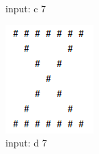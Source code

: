 \begin{figure}[H]
\begin{subfigure}{0.19\linewidth}
            \caption{input: c 7}
        \end{subfigure}
        \begin{subfigure}{0.19\linewidth}
            \centering
            \includegraphics[width = 1\linewidth]{../pic/4/4.d.png}
            \caption{input: d 7}
        \end{subfigure}
        \begin{subfigure}{0.19\linewidth}
            \centering

\end{subfigure}
\end{figure}
